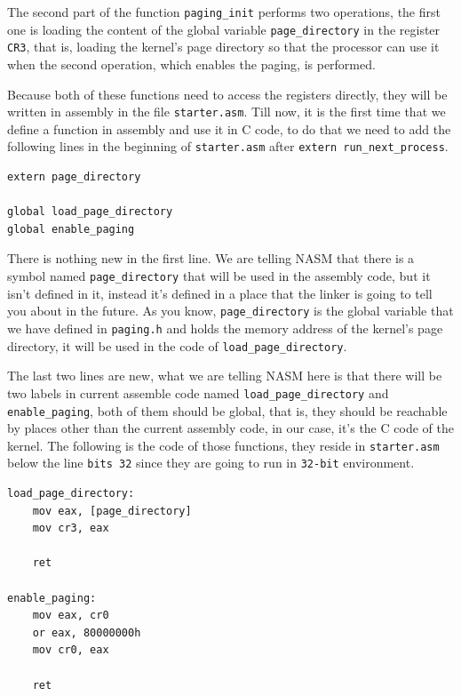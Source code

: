 The second part of the function \lstinline!paging_init! performs two
operations, the first one is loading the content of the global variable
\lstinline!page_directory! in the register \lstinline!CR3!, that is,
loading the kernel's page directory so that the processor can use it
when the second operation, which enables the paging, is performed.

Because both of these functions need to access the registers directly,
they will be written in assembly in the file \lstinline!starter.asm!.
Till now, it is the first time that we define a function in assembly and
use it in C code, to do that we need to add the following lines in the
beginning of \lstinline!starter.asm! after
\lstinline!extern run_next_process!.

\begin{lstlisting}
extern page_directory

global load_page_directory
global enable_paging
\end{lstlisting}

There is nothing new in the first line. We are telling NASM that there
is a symbol named \lstinline!page_directory! that will be used in the
assembly code, but it isn't defined in it, instead it's defined in a
place that the linker is going to tell you about in the future. As you
know, \lstinline!page_directory! is the global variable that we have
defined in \lstinline!paging.h! and holds the memory address of the
kernel's page directory, it will be used in the code of
\lstinline!load_page_directory!.

The last two lines are new, what we are telling NASM here is that there
will be two labels in current assemble code named
\lstinline!load_page_directory! and \lstinline!enable_paging!, both of
them should be global, that is, they should be reachable by places other
than the current assembly code, in our case, it's the C code of the
kernel. The following is the code of those functions, they reside in
\lstinline!starter.asm! below the line \lstinline!bits 32! since they
are going to run in \lstinline!32-bit! environment.

\begin{lstlisting}
load_page_directory:
    mov eax, [page_directory]
    mov cr3, eax
    
    ret
    
enable_paging:
    mov eax, cr0
    or eax, 80000000h
    mov cr0, eax
    
    ret
\end{lstlisting}

